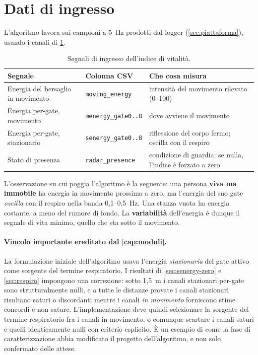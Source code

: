 \section{Dati di ingresso}
\label{sec:vitalita-ingressi}

L'algoritmo lavora sui campioni a 5~Hz prodotti dal logger
(\cref{sec:piattaforma}), usando i canali di \cref{tab:vitalita-ingressi}.

\begin{table}[htbp]
\centering
\caption{Segnali di ingresso dell'indice di vitalità.}
\label{tab:vitalita-ingressi}
\small
\begin{tabularx}{\linewidth}{@{}llX@{}}
\toprule
\textbf{Segnale} & \textbf{Colonna CSV} & \textbf{Che cosa misura} \\
\midrule
Energia del bersaglio in movimento & \texttt{moving\_energy} &
  intensità del movimento rilevato (0--100) \\
Energia per-gate, movimento & \texttt{menergy\_gate0..8} &
  dove avviene il movimento \\
Energia per-gate, stazionario & \texttt{senergy\_gate0..8} &
  riflessione del corpo fermo; oscilla con il respiro \\
Stato di presenza & \texttt{radar\_presence} &
  condizione di guardia: se nulla, l'indice è forzato a zero \\
\bottomrule
\end{tabularx}
\end{table}

L'osservazione su cui poggia l'algoritmo è la seguente: una persona \textbf{viva ma
immobile} ha energia in movimento prossima a zero, ma l'energia del suo gate
\emph{oscilla} con il respiro nella banda 0,1--0,5~Hz. Una stanza vuota ha energia
costante, a meno del rumore di fondo. La \textbf{variabilità} dell'energia è dunque
il segnale di vita minimo, quello che sta sotto il movimento.

\paragraph{Vincolo importante ereditato dal \cref{cap:moduli}.} La formulazione
iniziale dell'algoritmo usava l'energia \emph{stazionaria} del gate attivo come
sorgente del termine respiratorio. I risultati di \cref{sec:senergy-zero} e
\cref{sec:respiro} impongono una correzione: sotto 1,5~m i canali stazionari per-gate
sono strutturalmente nulli, e a tutte le distanze provate i canali stazionari
risultano saturi o discordanti mentre i canali \emph{in movimento} forniscono stime
concordi e non sature. L'implementazione deve quindi selezionare la sorgente del
termine respiratorio fra i canali in movimento, o comunque scartare i canali saturi
e quelli identicamente nulli con criterio esplicito. È un esempio di come la fase di
caratterizzazione abbia modificato il progetto dell'algoritmo, e non solo confermato
delle attese.

